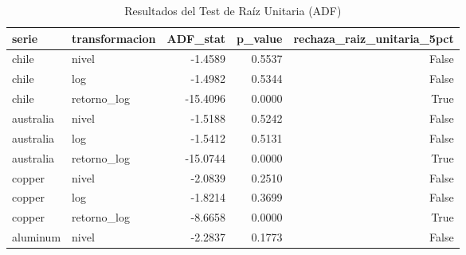 \begin{table}
\caption{Resultados del Test de Raíz Unitaria (ADF)}
\label{tab:adf}
\begin{tabular}{llrrr}
\toprule
serie & transformacion & ADF_stat & p_value & rechaza_raiz_unitaria_5pct \\
\midrule
chile & nivel & -1.4589 & 0.5537 & False \\
chile & log & -1.4982 & 0.5344 & False \\
chile & retorno_log & -15.4096 & 0.0000 & True \\
australia & nivel & -1.5188 & 0.5242 & False \\
australia & log & -1.5412 & 0.5131 & False \\
australia & retorno_log & -15.0744 & 0.0000 & True \\
copper & nivel & -2.0839 & 0.2510 & False \\
copper & log & -1.8214 & 0.3699 & False \\
copper & retorno_log & -8.6658 & 0.0000 & True \\
aluminum & nivel & -2.2837 & 0.1773 & False \\
\bottomrule
\end{tabular}
\end{table}

